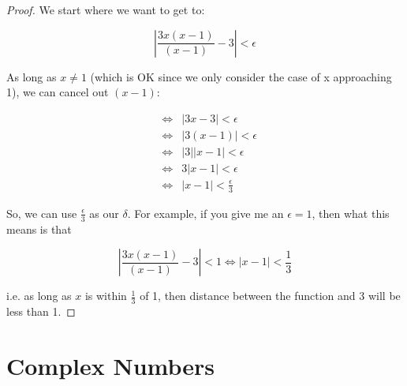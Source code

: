 \documentclass[12pt]{scrbook}
\begin{document}
\begin{proof}
We start where we want to get to:

\[ \left | \frac{3x(x-1)}{(x-1)} - 3 \right | < \epsilon \]

As long as $x \ne 1$ (which is OK since we only consider the case of x approaching 1), we can cancel out $(x - 1)$:

\begin{eqnarray*}
&\Leftrightarrow&  \left | 3x - 3 \right |  < \epsilon \\
&\Leftrightarrow& \left | 3 (x - 1) \right |  < \epsilon \\
&\Leftrightarrow& \left | 3 \right | \left | x - 1 \right | < \epsilon \\
&\Leftrightarrow& 3 \left | x - 1 \right | < \epsilon \\
&\Leftrightarrow& \left | x - 1 \right | < \frac{\epsilon}{3} 
\end{eqnarray*}

So, we can use $\frac{\epsilon}{3}$ as our $\delta$.  For example, if you give me an $\epsilon = 1$, then what this means is that

\[ \left | \frac{3x(x-1)}{(x-1)} - 3 \right | < 1 \Leftrightarrow \left | x-1\right | < \frac{1}{3} \]

i.e. as long as $x$ is within $\frac{1}{3}$ of 1, then distance between the function and 3 will be less than 1.

\end{proof}


\clearpage
\chapter{Complex Numbers}
\end{document}
